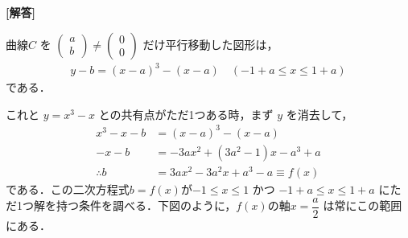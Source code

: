 \documentclass[../../main.tex]{subfiles}
\begin{document}
\begin{oframed}
  
\end{oframed}

{\bf [解答]}

曲線$C$ を
$
\begin{pmatrix} a \\ b
\end{pmatrix} \neq
\begin{pmatrix} 0 \\ 0
\end{pmatrix}
$
だけ平行移動した図形は，
\begin{align}
  y-b = (x-a)^3 - (x-a) \quad (-1+a \le x \le 1+a) \label{eq:1}
\end{align}
である．

これと $y=x^3-x$ との共有点がただ1つある時，まず $y$ を消去して，
\begin{align}
  x^3 - x - b &= (x-a)^3 - (x-a) \\
  -x - b &= -3a x^2 + (3a^2-1) x - a^3 + a \\
  \therefore
  b &= 3a x^2 - 3a^2 x + a^3 - a \equiv f(x) \label{eq:2}
\end{align}
である．この二次方程式$b=f(x)$が$-1 \le x \le 1$ かつ $-1+a \le x \le 1+a$ にただ1つ解を持つ条件を調べる．下図のように，$f(x)$の軸$x = \dfrac{a}{2}$ は常にこの範囲にある．
\end{document}
